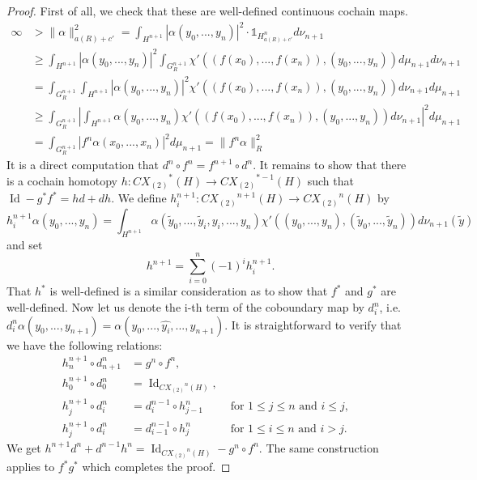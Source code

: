 \documentclass[10pt]{amsart}
\theoremstyle{plain}
\theoremstyle{definition}
\theoremstyle{remark}
\begin{document}
\begin{proof}
First of all, we check that these are well-defined continuous cochain maps.
\begin{align*}
\infty &>\|\alpha\|^2_{a(R)+c'}=\int_{H^{n+1}}|\alpha(y_0,...,y_n)|^2\cdot \mathds{1}_{H^n_{a(R)+c'}}d\nu_{n+1} \\
&\ge \int_{H^{n+1}}|\alpha(y_0,...,y_n)|^2\int_{G_R^{n+1}}\chi'\left((f(x_0),...,f(x_n)),(y_0,...,y_n)\right)d\mu_{n+1}d\nu_{n+1}\\
&=\int_{G_R^{n+1}}\int_{H^{n+1}}\left| \alpha(y_0,...,y_n)\right|^2\chi'\left((f(x_0),...,f(x_n)),(y_0,...,y_n)\right)d\nu_{n+1}d\mu_{n+1} \\
&\ge \int_{G_R^{n+1}}\left|\int_{H^{n+1}} \alpha(y_0,...,y_n)\chi'\left((f(x_0),...,f(x_n)),(y_0,...,y_n)\right)d\nu_{n+1}\right|^2d\mu_{n+1} \\
&=\int_{G_R^{n+1}}|f^n\alpha(x_0,...,x_n)|^2d\mu_{n+1} = \|f^n\alpha\|^2_{R}
\end{align*}
It is a direct computation that $d^n\circ f^n=f^{n+1}\circ d^n$.
It remains to show that there is a cochain homotopy $h\colon{CX_{(2)}}^*(H)\to {CX_{(2)}}^{*-1}(H)$ such that ${\operatorname{Id}} -g^*f^*=hd+dh$. We define $h_i^{n+1}\colon{CX_{(2)}}^{n+1}(H)\to {CX_{(2)}}^{n}(H)$ by
\[h_i^{n+1}\alpha(y_0,...,y_n)=\int_{H^{n+1}}\alpha(\tilde{y}_0,...,\tilde{y}_i,y_i,...,y_n)\chi'((y_0,...,y_n),(\tilde{y}_0,...,\tilde{y}_n))d\nu_{n+1}(\tilde{y})\]
and set 
\[h^{n+1}=\sum_{i=0}^n(-1)^ih_i^{n+1}.\]
That $h^*$ is well-defined
 is a similar consideration as to show that $f^*$ and $g^*$ are well-defined. Now let us denote the i-th term of the coboundary map by $d^n_i$, i.e. $d^n_i\alpha(y_0,...,y_{n+1})=\alpha(y_0,...,\widehat{y_i},...,y_{n+1})$. It is straightforward to verify that we have the following relations:
\begin{align*}
h_{n}^{n+1}\circ d^{n}_{n+1}&= g^n\circ f^n, \\
h_0^{n+1}\circ d^n_{0} 		&= {\operatorname{Id}}_{{CX_{(2)}}^n(H)}, \\
h_j^{n+1}\circ d_i^n &= d^{n-1}_i\circ h_{j-1}^n &\text{    for } 1\leq j\leq n \text{ and } i\leq j,& \\
h_j^{n+1} \circ d_i^n & = d_{i-1}^{n-1}\circ h_j^n &\text{    for } 1\leq i \leq n \text{ and } i>j.&
\end{align*}
We get $h^{n+1}d^n+d^{n-1}h^n={\operatorname{Id}}_{{CX_{(2)}}^n(H)} - g^n\circ f^n$.  The same construction applies to $f^*g^*$ which completes the proof.
\end{proof}
\end{document}
